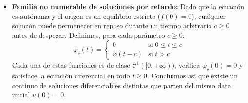 {\begin{itemize}
        Para continuar la trayectoria con diferenciabilidad para $t \geq \frac{1}{1 - q}$, resolvemos el problema de enlace:
        \[
            \begin{cases}
                u'(t) = 1 \\
                u\left(\frac{1}{1 - q}\right) = 1
            \end{cases}
        \]
        Integrando inmediatamente:
        \[
            u(t) = t + c \implies 1 = \frac{1}{1 - q} + c \implies c = 1 - \frac{1}{1 - q}
        \]
        de modo que:
        \[
            u(t) = t - \frac{1}{1 - q} + 1 \geq 1 \qquad \forall t \geq \frac{1}{1 - q}
        \]
        Como las derivadas laterales en el punto de empalme $t = \frac{1}{1 - q}$ coinciden:
        \[
            \lim_{t \to \left(\frac{1}{1-q}\right)^-} \varphi'(t) = 1^q = 1, \qquad \lim_{t \to \left(\frac{1}{1-q}\right)^+} u'(t) = 1
        \]
        obtenemos una solución $\varphi \in \mathcal{C}^1([0, +\infty); \, \mathbb{R})$ globalmente definida:
        \[
            \varphi(t) =
            \begin{cases}
                \left[ (1 - q)t \right]^{\frac{1}{1-q}} & \text{si } 0 \leq t \leq \frac{1}{1 - q} \\[2ex]
                t - \frac{1}{1 - q} + 1 & \text{si } t > \frac{1}{1 - q}
            \end{cases}
        \]

        \item \textbf{Familia no numerable de soluciones por retardo:} Dado que la ecuación es autónoma y el origen es un equilibrio estricto ($f(0) = 0$), cualquier solución puede permanecer en reposo durante un tiempo arbitrario $c \geq 0$ antes de despegar. Definimos, para cada parámetro $c \geq 0$:
        \[
            \varphi_c(t) =
            \begin{cases}
                0 & \text{si } 0 \leq t \leq c \\[1ex]
                \varphi(t - c) & \text{si } t > c
            \end{cases}
        \]
        Cada una de estas funciones es de clase $\mathcal{C}^1([0, +\infty))$, verifica $\varphi_c(0) = 0$ y satisface la ecuación diferencial en todo $t \geq 0$. Concluimos así que existe un continuo de soluciones diferenciables distintas que parten del mismo dato inicial $u(0) = 0$.
    \end{itemize}

    \begin{center}
\end{center}}
